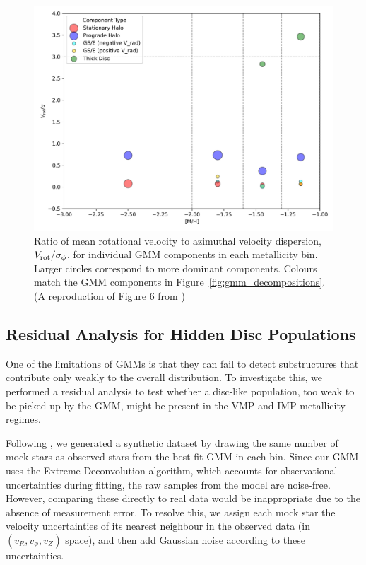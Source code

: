 \documentclass[a4paper,12pt]{article}
\begin{document}
\begin{figure}[H]
    \centering
    \includegraphics[width=\linewidth]{../figures/v_over_sigma_per_component.png}
    \caption{Ratio of mean rotational velocity to azimuthal velocity dispersion, 
    $V_{\rm rot} / \sigma_\phi$, for individual GMM components in each metallicity bin. 
    Larger circles correspond to more dominant components. Colours match the GMM components 
    in Figure~\ref{fig:gmm_decompositions}.(A reproduction of Figure 6 from \citet{zhang2024existencemetalpoordiscmilky})}
    \label{fig:v_over_sigma}
\end{figure}

\subsection{Residual Analysis for Hidden Disc Populations}

One of the limitations of GMMs is that they can fail to detect substructures that contribute 
only weakly to the overall distribution. To investigate this, we performed a residual analysis to test 
whether a disc-like population, too weak to be picked up by the GMM, might be present 
in the VMP and IMP metallicity regimes.

Following \citet{zhang2024existencemetalpoordiscmilky}, we generated a synthetic dataset by drawing 
the same number of mock stars as observed stars from 
the best-fit GMM in each bin. Since our GMM uses the Extreme Deconvolution algorithm, which accounts 
for observational uncertainties during fitting, the raw samples from the model are noise-free. 
However, comparing these directly to real data would be inappropriate due to the absence of measurement 
error. To resolve this, we assign each mock star the velocity uncertainties of its nearest neighbour 
in the observed data (in $(v_R, v_\phi, v_Z)$ space), and then add Gaussian noise according to 
these uncertainties.
\end{document}
